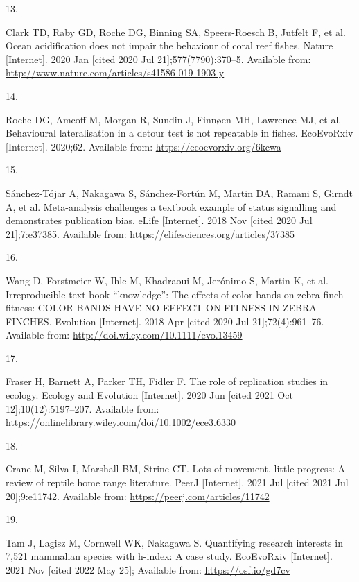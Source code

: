 \documentclass[10pt,a4paper]{article}
\newlength{\cslhangindent}
\newlength{\csllabelwidth}
\newlength{\cslentryspacingunit} %
\newenvironment{CSLReferences}[2] %
 {%
  \setlength{\parindent}{0pt}
  \ifodd #1
  \let\oldpar\par
  \def\par{\hangindent=\cslhangindent\oldpar}
  \fi
  \setlength{\parskip}{#2\cslentryspacingunit}
 }%
 {}
\newcommand{\CSLLeftMargin}[1]{\parbox[t]{\csllabelwidth}{#1}}
\newcommand{\CSLRightInline}[1]{\parbox[t]{\linewidth - \csllabelwidth}{#1}\break}
\begin{document}
\begin{CSLReferences}{0}{0}
\leavevmode{}%
\CSLLeftMargin{13. }
\CSLRightInline{Clark TD, Raby GD, Roche DG, Binning SA, Speers-Roesch B, Jutfelt F, et al. Ocean acidification does not impair the behaviour of coral reef fishes. Nature {[}Internet{]}. 2020 Jan {[}cited 2020 Jul 21{]};577(7790):370--5. Available from: \url{http://www.nature.com/articles/s41586-019-1903-y}}

\leavevmode{}%
\CSLLeftMargin{14. }
\CSLRightInline{Roche DG, Amcoff M, Morgan R, Sundin J, Finnøen MH, Lawrence MJ, et al. Behavioural lateralisation in a detour test is not repeatable in fishes. EcoEvoRxiv {[}Internet{]}. 2020;62. Available from: \url{https://ecoevorxiv.org/6kcwa}}

\leavevmode{}%
\CSLLeftMargin{15. }
\CSLRightInline{Sánchez-Tójar A, Nakagawa S, Sánchez-Fortún M, Martin DA, Ramani S, Girndt A, et al. Meta-analysis challenges a textbook example of status signalling and demonstrates publication bias. eLife {[}Internet{]}. 2018 Nov {[}cited 2020 Jul 21{]};7:e37385. Available from: \url{https://elifesciences.org/articles/37385}}

\leavevmode{}%
\CSLLeftMargin{16. }
\CSLRightInline{Wang D, Forstmeier W, Ihle M, Khadraoui M, Jerónimo S, Martin K, et al. Irreproducible text-book {``knowledge''}: {The} effects of color bands on zebra finch fitness: {COLOR} {BANDS} {HAVE} {NO} {EFFECT} {ON} {FITNESS} {IN} {ZEBRA} {FINCHES}. Evolution {[}Internet{]}. 2018 Apr {[}cited 2020 Jul 21{]};72(4):961--76. Available from: \url{http://doi.wiley.com/10.1111/evo.13459}}

\leavevmode{}%
\CSLLeftMargin{17. }
\CSLRightInline{Fraser H, Barnett A, Parker TH, Fidler F. The role of replication studies in ecology. Ecology and Evolution {[}Internet{]}. 2020 Jun {[}cited 2021 Oct 12{]};10(12):5197--207. Available from: \url{https://onlinelibrary.wiley.com/doi/10.1002/ece3.6330}}

\leavevmode{}%
\CSLLeftMargin{18. }
\CSLRightInline{Crane M, Silva I, Marshall BM, Strine CT. Lots of movement, little progress: A review of reptile home range literature. PeerJ {[}Internet{]}. 2021 Jul {[}cited 2021 Jul 20{]};9:e11742. Available from: \url{https://peerj.com/articles/11742}}

\leavevmode{}%
\CSLLeftMargin{19. }
\CSLRightInline{Tam J, Lagisz M, Cornwell WK, Nakagawa S. Quantifying research interests in 7,521 mammalian species with h-index: A case study. EcoEvoRxiv {[}Internet{]}. 2021 Nov {[}cited 2022 May 25{]}; Available from: \url{https://osf.io/gd7cv}}


\end{CSLReferences}
\end{document}
